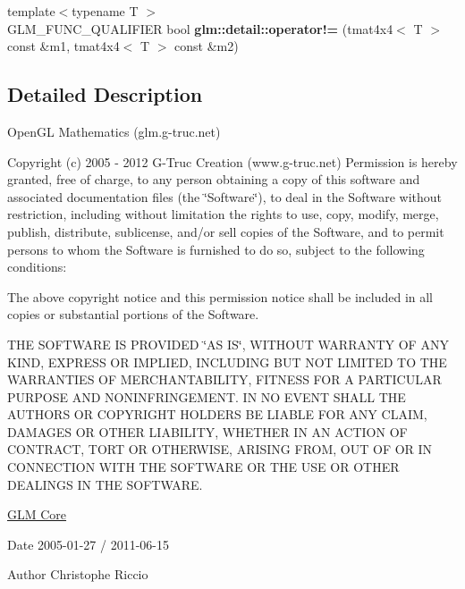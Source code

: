 \begin{DoxyCompactItemize}
\item 
\hypertarget{namespaceglm_1_1detail_abb049d564233df24dda4531d2a1e2ad3}{{\footnotesize template$<$typename T $>$ }\\\-G\-L\-M\-\_\-\-F\-U\-N\-C\-\_\-\-Q\-U\-A\-L\-I\-F\-I\-E\-R bool {\bfseries glm\-::detail\-::operator!=} (tmat4x4$<$ \-T $>$ const \&m1, tmat4x4$<$ \-T $>$ const \&m2)}\label{namespaceglm_1_1detail_abb049d564233df24dda4531d2a1e2ad3}

\end{DoxyCompactItemize}


\subsection{\-Detailed \-Description}
\-Open\-G\-L \-Mathematics (glm.\-g-\/truc.\-net)

\-Copyright (c) 2005 -\/ 2012 \-G-\/\-Truc \-Creation (www.\-g-\/truc.\-net) \-Permission is hereby granted, free of charge, to any person obtaining a copy of this software and associated documentation files (the \char`\"{}\-Software\char`\"{}), to deal in the \-Software without restriction, including without limitation the rights to use, copy, modify, merge, publish, distribute, sublicense, and/or sell copies of the \-Software, and to permit persons to whom the \-Software is furnished to do so, subject to the following conditions\-:

\-The above copyright notice and this permission notice shall be included in all copies or substantial portions of the \-Software.

\-T\-H\-E \-S\-O\-F\-T\-W\-A\-R\-E \-I\-S \-P\-R\-O\-V\-I\-D\-E\-D \char`\"{}\-A\-S I\-S\char`\"{}, \-W\-I\-T\-H\-O\-U\-T \-W\-A\-R\-R\-A\-N\-T\-Y \-O\-F \-A\-N\-Y \-K\-I\-N\-D, \-E\-X\-P\-R\-E\-S\-S \-O\-R \-I\-M\-P\-L\-I\-E\-D, \-I\-N\-C\-L\-U\-D\-I\-N\-G \-B\-U\-T \-N\-O\-T \-L\-I\-M\-I\-T\-E\-D \-T\-O \-T\-H\-E \-W\-A\-R\-R\-A\-N\-T\-I\-E\-S \-O\-F \-M\-E\-R\-C\-H\-A\-N\-T\-A\-B\-I\-L\-I\-T\-Y, \-F\-I\-T\-N\-E\-S\-S \-F\-O\-R \-A \-P\-A\-R\-T\-I\-C\-U\-L\-A\-R \-P\-U\-R\-P\-O\-S\-E \-A\-N\-D \-N\-O\-N\-I\-N\-F\-R\-I\-N\-G\-E\-M\-E\-N\-T. \-I\-N \-N\-O \-E\-V\-E\-N\-T \-S\-H\-A\-L\-L \-T\-H\-E \-A\-U\-T\-H\-O\-R\-S \-O\-R \-C\-O\-P\-Y\-R\-I\-G\-H\-T \-H\-O\-L\-D\-E\-R\-S \-B\-E \-L\-I\-A\-B\-L\-E \-F\-O\-R \-A\-N\-Y \-C\-L\-A\-I\-M, \-D\-A\-M\-A\-G\-E\-S \-O\-R \-O\-T\-H\-E\-R \-L\-I\-A\-B\-I\-L\-I\-T\-Y, \-W\-H\-E\-T\-H\-E\-R \-I\-N \-A\-N \-A\-C\-T\-I\-O\-N \-O\-F \-C\-O\-N\-T\-R\-A\-C\-T, \-T\-O\-R\-T \-O\-R \-O\-T\-H\-E\-R\-W\-I\-S\-E, \-A\-R\-I\-S\-I\-N\-G \-F\-R\-O\-M, \-O\-U\-T \-O\-F \-O\-R \-I\-N \-C\-O\-N\-N\-E\-C\-T\-I\-O\-N \-W\-I\-T\-H \-T\-H\-E \-S\-O\-F\-T\-W\-A\-R\-E \-O\-R \-T\-H\-E \-U\-S\-E \-O\-R \-O\-T\-H\-E\-R \-D\-E\-A\-L\-I\-N\-G\-S \-I\-N \-T\-H\-E \-S\-O\-F\-T\-W\-A\-R\-E.

\hyperlink{group__core}{\-G\-L\-M \-Core}

\begin{DoxyDate}{\-Date}
2005-\/01-\/27 / 2011-\/06-\/15 
\end{DoxyDate}
\begin{DoxyAuthor}{\-Author}
\-Christophe \-Riccio 
\end{DoxyAuthor}
